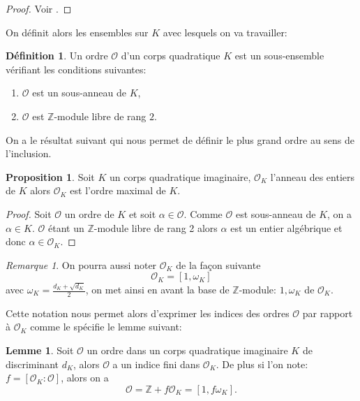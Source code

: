 \documentclass[10pt,a4paper]{book}
\theoremstyle{plain}
\theoremstyle{definition}
\theoremstyle{definition}
\newtheorem{lem}[thm]{Lemme}
\theoremstyle{definition}
\theoremstyle{definition}
\newtheorem{prop}[thm]{Proposition}
\theoremstyle{definition}
\newtheorem{defi}[thm]{Définition}
\theoremstyle{remark}
\newtheorem{rem}[thm]{Remarque}
\theoremstyle{remark}
\theoremstyle{definition}
\begin{document}
\begin{proof}
Voir \cite[exercise 5.7]{Cox89}.
\end{proof}

On définit alors les ensembles sur $K$  avec lesquels on va travailler:

\begin{defi}
Un ordre $\mathcal{O}$ d'un corps quadratique $K$ est un sous-ensemble vérifiant les conditions suivantes: 
\begin{enumerate}
\item $\mathcal{O}$ est un sous-anneau de $K$,
\item $\mathcal{O}$ est $\mathbb{Z}$-module libre de rang $2$.
\end{enumerate} 
\end{defi}

On a le résultat suivant qui nous permet de définir le plus grand ordre au sens de l'inclusion.

\begin{prop}
Soit $K$ un corps quadratique imaginaire, $\mathcal{O}_K$ l'anneau des entiers de $K$ alors $\mathcal{O}_K$ est l'ordre maximal de $K$.
\end{prop}

\begin{proof}
Soit $\mathcal{O}$ un ordre de $K$ et soit $\alpha \in \mathcal{O}$. Comme $\mathcal{O}$ est sous-anneau de $K$, on a $\alpha \in K$. $\mathcal{O}$ étant un $\mathbb{Z}$-module libre de rang 2 alors $\alpha$ est un entier algébrique et donc $\alpha \in \mathcal{O}_K$.
\end{proof}


\begin{rem}
On pourra aussi noter $\mathcal{O}_K$ de la façon suivante 
\[ \mathcal{O}_K =[1, \omega_K] \]
avec $\omega_K = \frac{d_K+\sqrt{d_K}}{2} $, on met ainsi en avant la base de $\mathbb{Z}$-module: $1, \omega_K$ de $\mathcal{O}_K$.
\end{rem}

Cette notation nous permet alors d'exprimer les indices des ordres $\mathcal{O}$ par rapport à $\mathcal{O}_K$ comme le spécifie le lemme suivant:

\begin{lem}
Soit $\mathcal{O}$ un ordre dans un corps quadratique imaginaire $K$ de discriminant $d_K$, alors $\mathcal{O}$ a un indice fini dans $\mathcal{O}_K$. De plus si l'on note: $f= [\mathcal{O}_K : \mathcal{O}]$, alors on a 
\[ \mathcal{O} = \mathbb{Z} + f\mathcal{O}_K = [1, f\omega_K]. \]
\end{lem}
\end{document}
